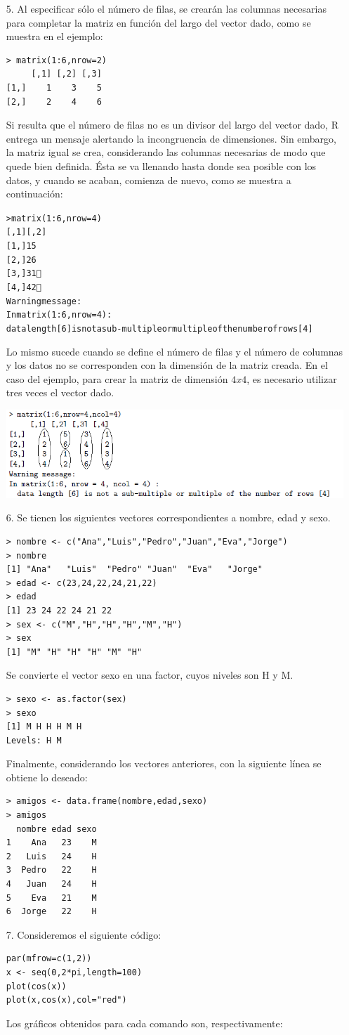 \documentclass[11pt,a4paper]{article}
\begin{document}
\begin{itemize}
\item[5.] Al especificar sólo el número de filas, se crearán las columnas necesarias para completar la matriz en función del largo del vector dado, como se muestra en el ejemplo:
\begin{verbatim} 
> matrix(1:6,nrow=2)
     [,1] [,2] [,3]
[1,]    1    3    5
[2,]    2    4    6
\end{verbatim}
Si resulta que el número de filas no es un divisor del largo del vector dado, R entrega un mensaje alertando la incongruencia de dimensiones. Sin embargo, la matriz igual se crea, considerando las columnas necesarias de modo que quede bien definida. Ésta se va llenando hasta donde sea posible con los datos, y cuando se acaban, comienza de nuevo, como se muestra a continuación:
\begin{alltt}
> matrix(1:6,nrow=4)
     [,1] [,2]
[1,]    1    5
[2,]    2    6
[3,]    3    \textcircled{1}
[4,]    4    \textcircled{2}
Warning message:
In matrix(1:6, nrow = 4) :
  data length [6] is not a sub-multiple or multiple of the number of rows [4]
\end{alltt}
Lo mismo sucede cuando se define el número de filas y el número de columnas y los datos no se corresponden con la dimensión de la matriz creada. En el caso del ejemplo, para crear la matriz de dimensión $4 x 4$, es necesario utilizar tres veces el vector dado.

\includegraphics[scale=0.78]{matriz1}
\item[6.] Se tienen los siguientes vectores correspondientes a nombre, edad y sexo.
\begin{verbatim}
> nombre <- c("Ana","Luis","Pedro","Juan","Eva","Jorge")
> nombre
[1] "Ana"   "Luis"  "Pedro" "Juan"  "Eva"   "Jorge"
> edad <- c(23,24,22,24,21,22)
> edad
[1] 23 24 22 24 21 22
> sex <- c("M","H","H","H","M","H")
> sex
[1] "M" "H" "H" "H" "M" "H"
\end{verbatim}
Se convierte el vector sexo en una factor, cuyos niveles son H y M.
\begin{verbatim}
> sexo <- as.factor(sex)
> sexo
[1] M H H H M H
Levels: H M
\end{verbatim}
Finalmente, considerando los vectores anteriores, con la siguiente línea se obtiene lo deseado:
\begin{verbatim}
> amigos <- data.frame(nombre,edad,sexo)
> amigos
  nombre edad sexo
1    Ana   23    M
2   Luis   24    H
3  Pedro   22    H
4   Juan   24    H
5    Eva   21    M
6  Jorge   22    H
\end{verbatim}
\item[7.] Consideremos el siguiente código:
\begin{verbatim}
par(mfrow=c(1,2))
x <- seq(0,2*pi,length=100)
plot(cos(x))
plot(x,cos(x),col="red")
\end{verbatim}
Los gráficos obtenidos para cada comando son, respectivamente:


\end{itemize}
\end{document}
